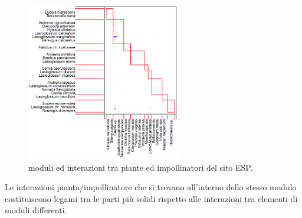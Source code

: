 \documentclass[main.tex]{subfiles}
\begin{document}
\begin{figure}[H]
\centering
\includegraphics[width=0.6\textwidth]{./Immagini/plotModuleWeb_Network_Api_Piante_ESP.png}
\caption{moduli ed interazioni tra piante ed impollinatori del sito ESP.}
\label{fig:moduli ESP}
\end{figure}

Le interazioni pianta/impollinatore che si trovano all’interno dello stesso modulo costituiscono legami tra le parti più solidi rispetto alle interazioni tra elementi di moduli differenti.

\clearpage
\end{document}
